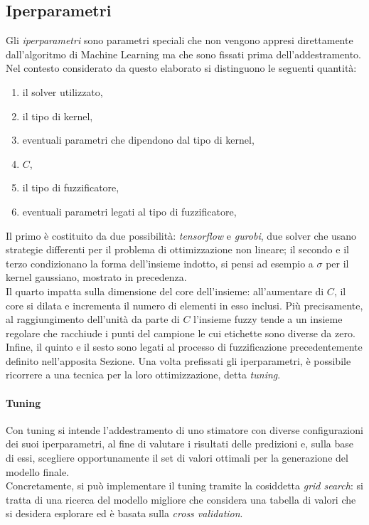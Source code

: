 \documentclass[12pt]{report}
\theoremstyle{definition}
\begin{document}
\subsection{Iperparametri}
Gli \textit{iperparametri} sono parametri speciali che non vengono appresi direttamente dall'algoritmo di Machine Learning ma che sono fissati prima dell'addestramento.
Nel contesto considerato da questo elaborato si distinguono le seguenti quantità: 
\begin{enumerate}
    \item il solver utilizzato,
    \item il tipo di kernel,
    \item eventuali parametri che dipendono dal tipo di kernel,
    \item $C$,
    \item il tipo di fuzzificatore,
    \item eventuali parametri legati al tipo di fuzzificatore,
    
\end{enumerate}
Il primo è costituito da due possibilità: \textit{tensorflow} e \textit{gurobi}, due solver che usano strategie differenti per il problema di ottimizzazione non lineare; il secondo e il terzo condizionano la forma dell'insieme indotto, si pensi ad esempio a $\sigma$ per il kernel gaussiano, mostrato in precedenza.
\\
Il quarto impatta sulla dimensione del core dell'insieme:
all'aumentare di $C$, il core si dilata e incrementa il numero di elementi in esso inclusi.
Più precisamente, al raggiungimento dell'unità da parte di $C$ l'insieme fuzzy tende a un insieme regolare che racchiude i punti del campione le cui etichette sono diverse da zero.
\\
Infine, il quinto e il sesto sono legati al processo di fuzzificazione precedentemente definito nell'apposita Sezione.
Una volta prefissati gli iperparametri, è possibile ricorrere a una tecnica per la loro ottimizzazione, detta \textit{tuning}.

\paragraph{Tuning} Con tuning si intende l'addestramento di uno stimatore con diverse configurazioni dei suoi iperparametri, al fine di valutare i risultati delle predizioni e, sulla base di essi, scegliere opportunamente il set di valori ottimali per la generazione del modello finale.
\\
Concretamente, si può implementare il tuning tramite la cosiddetta \textit{grid search}: si tratta di una ricerca del modello migliore che considera una tabella di valori che si desidera esplorare ed è basata sulla \textit{cross validation}.
\end{document}
